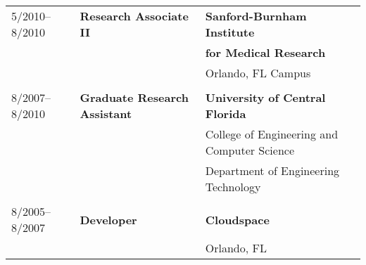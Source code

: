 \documentclass[10pt,letterpaper]{article}
\begin{document}
\begin{tabular}{lll}
\\5/2010--8/2010 &  \textbf{Research Associate II} & \textbf{Sanford-Burnham Institute }\\
&& \hspace*{3em}\textbf{for Medical Research}\\
&& Orlando, FL Campus\\

\\8/2007--8/2010 & \textbf{Graduate Research Assistant} & \textbf{University of Central Florida}\\
			&								& College of Engineering and Computer Science\\
			&								& Department of Engineering Technology\\
\\8/2005--8/2007 & \textbf{Developer}					& \textbf{Cloudspace}\\
			&								& Orlando, FL\\
\end{tabular}
\end{document}
